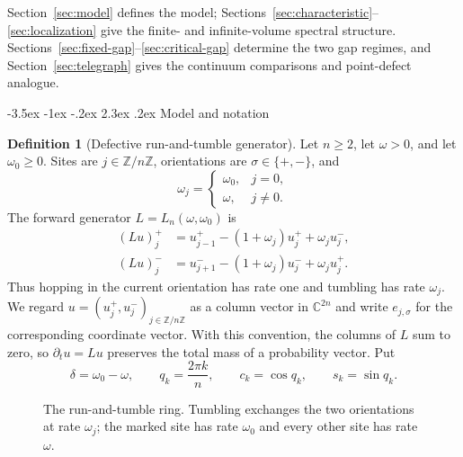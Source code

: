 \documentclass[twoside,10pt]{article}
\makeatletter
\numberwithin{equation}{section}
\theoremstyle{slbody}
\theoremstyle{definition}
\newtheorem{definition}[theorem]{Definition}
\theoremstyle{remark}
\newcommand{\Z}{\mathbb Z}
\newcommand{\C}{\mathbb C}
\renewcommand{\section}{%
  \@startsection{section}{1}{\z@}%
    {-3.5ex \@plus -1ex \@minus -.2ex}%
    {2.3ex \@plus .2ex}%
    {\normalfont\large\bfseries}}
\makeatother
\begin{document}
Section~\ref{sec:model} defines the model; Sections~\ref{sec:characteristic}--
\ref{sec:localization} give the finite- and infinite-volume spectral
structure.  Sections~\ref{sec:fixed-gap}--\ref{sec:critical-gap} determine
the two gap regimes, and Section~\ref{sec:telegraph} gives the continuum
comparisons and point-defect analogue.

\section{Model and notation}\label{sec:model}

\begin{definition}[Defective run-and-tumble generator]\label{def:generator}
Let $n\geq2$, let $\omega>0$, and let $\omega _0\geq0$.  Sites are
$j\in\Z/n\Z$, orientations are $\sigma\in\{+,-\}$, and
\[
  \omega_j=\begin{cases}\omega_0,&j=0,\\ \omega,&j\ne0.\end{cases}
\]
The forward generator $L=L_n(\omega,\omega_0)$ is
\begin{align}
 (Lu)^+_j&=u^+_{j-1}-(1+\omega_j)u^+_j+\omega_j u^-_j,\label{eq:generator-plus}\\
 (Lu)^-_j&=u^-_{j+1}-(1+\omega_j)u^-_j+\omega_j u^+_j.\label{eq:generator-minus}
\end{align}
Thus hopping in the current orientation has rate one and tumbling has
rate $\omega_j$.  We regard $u=(u_j^+,u_j^-)_{j\in\Z/n\Z}$ as a column
vector in $\C^{2n}$ and write $e_{j,\sigma}$ for the corresponding
coordinate vector.  With this convention, the columns of $L$ sum to zero,
so $\partial_tu=Lu$ preserves the total mass of a probability vector.  Put
\[
 \delta=\omega_0-\omega,\qquad
 q_k=\frac{2\pi k}{n},\qquad c_k=\cos q_k,\qquad s_k=\sin q_k.
\]
\end{definition}

\begin{figure}[H]
\centering
{}
\caption{The run-and-tumble ring.  Tumbling exchanges the two
orientations at rate $\omega_j$; the marked site has rate $\omega_0$ and
every other site has rate $\omega$.}
\label{fig:model}
\end{figure}
\end{document}
